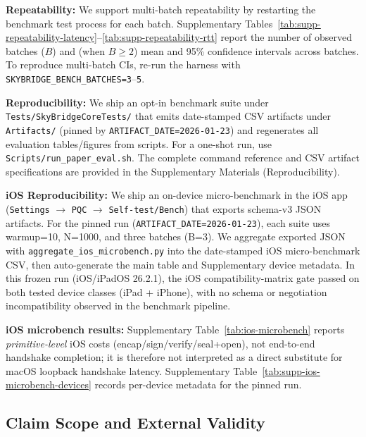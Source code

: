 \documentclass[10pt,journal,compsoc]{IEEEtran}
\newcommand{\artifactdate}{2026-01-23}
\begin{document}
\textbf{Repeatability:} We support multi-batch repeatability by
restarting the benchmark test process for each batch. Supplementary
Tables~\ref{tab:supp-repeatability-latency}--\ref{tab:supp-repeatability-rtt}
report the number of observed batches ($B$) and (when $B \ge 2$) mean and
95\% confidence intervals across batches. To reproduce multi-batch CIs,
re-run the harness with \texttt{SKYBRIDGE\_BENCH\_BATCHES=3}--\texttt{5}.

\textbf{Reproducibility:} We ship an opt-in benchmark suite under \texttt{Tests/\allowbreak SkyBridgeCoreTests/} that emits date-stamped CSV artifacts under \texttt{Artifacts/} (pinned by \texttt{ARTIFACT\_DATE=\artifactdate}) and regenerates all evaluation tables/figures from scripts. For a one-shot run, use \texttt{Scripts/\allowbreak run\_\allowbreak paper\_\allowbreak eval.sh}. The complete command reference and CSV artifact specifications are provided in the Supplementary Materials (Reproducibility).

\textbf{iOS Reproducibility:} We ship an on-device micro-benchmark in
the iOS app (\texttt{Settings} $\rightarrow$ \texttt{PQC} $\rightarrow$
\texttt{Self-test/Bench}) that exports schema-v3 JSON artifacts.
For the pinned run (\texttt{ARTIFACT\_DATE=\artifactdate}), each suite uses
warmup=10, N=1000, and three batches (B=3). We aggregate exported JSON
with \texttt{aggregate\_ios\_microbench.py} into the date-stamped iOS
micro-benchmark CSV, then auto-generate the main table and Supplementary
device metadata. In this frozen run
(iOS/iPadOS 26.2.1), the iOS compatibility-matrix gate passed on both
tested device classes (iPad + iPhone), with no schema or negotiation
incompatibility observed in the benchmark pipeline.

\textbf{iOS microbench results:} Supplementary
Table~\ref{tab:ios-microbench} reports \emph{primitive-level} iOS costs
(encap/sign/verify/seal+open), not end-to-end handshake completion; it
is therefore not interpreted as a direct substitute for macOS loopback
handshake latency. Supplementary
Table~\ref{tab:supp-ios-microbench-devices} records per-device metadata
for the pinned run.

\subsection{Claim Scope and External Validity}\label{sec:claim-scope-validity}
\end{document}

